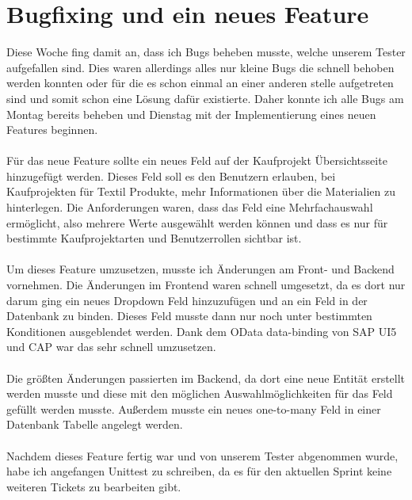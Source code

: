 \section{Bugfixing und ein neues Feature}
Diese Woche fing damit an, dass ich Bugs beheben musste, welche unserem Tester aufgefallen sind. Dies waren allerdings alles nur kleine Bugs die schnell behoben werden konnten oder für die es schon einmal an einer anderen stelle aufgetreten sind und somit schon eine Lösung dafür existierte. Daher konnte ich alle Bugs am Montag bereits beheben und Dienstag mit der Implementierung eines neuen Features beginnen. \\\\
Für das neue Feature sollte ein neues Feld auf der Kaufprojekt Übersichtsseite hinzugefügt werden. Dieses Feld soll es den Benutzern erlauben, bei Kaufprojekten für Textil Produkte, mehr Informationen über die Materialien zu hinterlegen. Die Anforderungen waren, dass das Feld eine Mehrfachauswahl ermöglicht, also mehrere Werte ausgewählt werden können und dass es nur für bestimmte Kaufprojektarten und Benutzerrollen sichtbar ist. \\\\
Um dieses Feature umzusetzen, musste ich Änderungen am Front- und Backend vornehmen. Die Änderungen im Frontend waren schnell umgesetzt, da es dort nur darum ging ein neues Dropdown Feld hinzuzufügen und an ein Feld in der Datenbank zu binden. Dieses Feld musste dann nur noch unter bestimmten Konditionen ausgeblendet werden. Dank dem OData data-binding von SAP UI5 und CAP war das sehr schnell umzusetzen. \\\\
Die größten Änderungen passierten im Backend, da dort eine neue Entität erstellt werden musste und diese mit den möglichen Auswahlmöglichkeiten für das Feld gefüllt werden musste. Außerdem musste ein neues one-to-many Feld in einer Datenbank Tabelle angelegt werden. \\\\
Nachdem dieses Feature fertig war und von unserem Tester abgenommen wurde, habe ich angefangen Unittest zu schreiben, da es für den aktuellen Sprint keine weiteren Tickets zu bearbeiten gibt. \\\\

